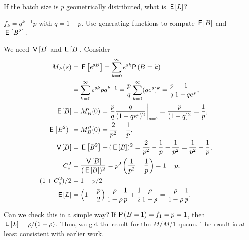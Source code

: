 \begin{exercise}
  If the batch size is $p$ geometrically distributed, what is $\,\mathsf{E}\left[L\right]$?
\begin{hint}
$f_k=q^{k-1}p$ with $q=1-p$. Use generating functions to compute $\,\mathsf{E}\left[B\right]$ and $\,\mathsf{E}\left[B^2\right]$.
\end{hint}
\begin{solution}
  We need $\,\mathsf{V}\left[B\right]$ and $\,\mathsf{E}\left[B\right]$. Consider
  \begin{align*}
    M_B(s) 
&= \E{e^{sB}} = \sum_{k=0}^\infty e^{sk} \P{B=k} \\
&= \sum_{k=0}^\infty e^{sk} p q^{k-1} 
= \frac p q \sum_{k=0}^\infty (q e^s)^k = \frac p q \frac1{1-qe^s},\\
  \E B &= M_B'(0) = \left.\frac p q \frac q{(1-q e^s)^2}\right|_{s=0}= \frac p{(1-q)^2} = \frac 1 p,\\
  \E{B^2)} &= M_B''(0) = \frac2{p^2} - \frac1p, \\
  \V B &= \E{B^2} - (\E B)^2 = \frac2{p^2} - \frac1p - \frac1{p^2} = \frac1{p^2}-\frac1p,\\
  C_s^2&= \frac{\V B}{(\E B)^2} = p^2 \left(\frac1{p^2}-\frac1p\right)=1-p,\\
  (1+C_s^2)/2 &= 1-p/2\\
  \E L &= 
\left(1-\frac p2\right) \frac\rho{1-\rho} \frac 1 p + \frac12\frac\rho{1-\rho}
=\frac\rho{1-\rho} \frac 1 p.
\end{align*}

Can we check this in a simple way? If $\P{B=1}=f_1 = p =1$, then
$\,\mathsf{E}\left[L\right]=\rho/(1-\rho)$. Thus, we get the result for the $M/M/1$
queue. The result is at least consistent with earlier work.
\end{solution}
\end{exercise}

